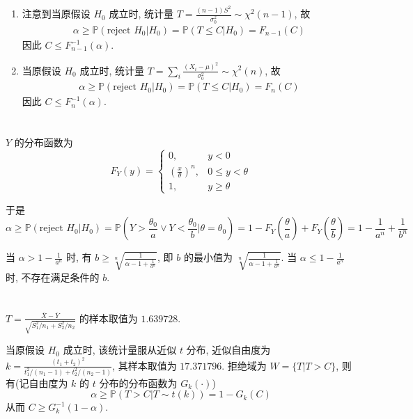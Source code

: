 \documentclass[8pt]{article}
\theoremstyle{compact}
\def\le{\leqslant}
\def\ge{\geqslant}
\def\P#1{\mathbb{P}\left({#1}\right)}
\begin{document}
\section{}
\begin{enumerate}
	\item 注意到当原假设 $H_0$ 成立时, 统计量 $T = \frac{(n-1)S^2}{\sigma_0^2}\sim \chi^2(n-1)$, 故 \begin{align*}
		\alpha \ge \P{\text{reject }H_0 | H_0} = \P{T \le C | H_0} = F_{n-1}(C)
	\end{align*}
	因此 $C \le F_{n-1}^{-1}(\alpha)$.
	\item 当原假设 $H_0$ 成立时, 统计量 $T = \sum_i \frac{(X_i - \mu)^2}{\sigma_0^2} \sim \chi^2(n)$, 故 \begin{align*}
		\alpha \ge \P{\text{reject }H_0 | H_0} = \P{T \le C | H_0} = F_{n}(C)
	\end{align*}
	因此 $C \le F_{n}^{-1}(\alpha)$.
\end{enumerate}

\section{}
$Y$ 的分布函数为 $$F_Y(y) = \begin{cases}
	0, & y < 0 \\
	\left(\frac{x}{\theta}\right)^n, & 0 \le y < \theta \\
	1, & y \ge \theta
\end{cases}$$

于是 $$\alpha \ge \P{\text{reject }H_0 | H_0} = \P{Y > \frac{\theta_0}{a} \vee Y < \frac{\theta_0}{b} | \theta = \theta_0} = 1 - F_Y\left(\frac{\theta}{a}\right) + F_Y\left(\frac{\theta}{b}\right) = 1 - \frac{1}{a^n} + \frac{1}{b^n}$$

当 $\alpha > 1 - \frac{1}{a^n}$ 时, 有 $b \ge \sqrt[n]{\frac{1}{\alpha - 1 + \frac{1}{a^n}}}$, 即 $b$ 的最小值为 $\sqrt[n]{\frac{1}{\alpha - 1 + \frac{1}{a^n}}}$. 当 $\alpha \le 1 - \frac{1}{a^n}$ 时, 不存在满足条件的 $b$.

\section{}

$T = \frac{\overline{X} - \overline{Y}}{\sqrt{S_1^2 / n_1 + S_2^2 / n_2}}$ 的样本取值为 $1.639728$.

当原假设 $H_0$ 成立时, 该统计量服从近似 $t$ 分布, 近似自由度为 $k = \frac{(t_1 + t_2)^2}{t_1^2 / (n_1 - 1) + t_2^2 / (n_2 - 1)}$, 其样本取值为 $17.371796$. 拒绝域为 $W = \{T | T > C\}$, 则有(记自由度为 $k$ 的 $t$ 分布的分布函数为 $G_k(\cdot)$) $$\alpha \ge \P{T > C | T \sim t(k)} = 1 - G_k(C)$$
从而 $C \ge G_k^{-1}(1 - \alpha)$.
\end{document}
